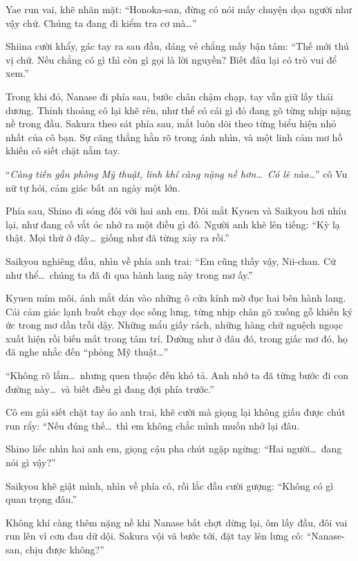 \documentclass[../main.tex]{subfiles}
\begin{document}
Yae run vai, khẽ nhăn mặt: ``Honoka-san, đừng có nói mấy chuyện dọa người như vậy chứ. Chúng ta đang đi kiểm tra cơ mà\dots''

Shiina cười khẩy, gác tay ra sau đầu, dáng vẻ chẳng mấy bận tâm: ``Thế mới thú vị chứ. Nếu chẳng có gì thì còn gì gọi là lời nguyền? Biết đâu lại có trò vui để xem.''

Trong khi đó, Nanase đi phía sau, bước chân chậm chạp, tay vẫn giữ lấy thái dương. Thỉnh thoảng cô lại khẽ rên, như thể có cái gì đó đang gõ từng nhịp nặng nề trong đầu. Sakura theo sát phía sau, mắt luôn dõi theo từng biểu hiện nhỏ nhất của cô bạn. Sự căng thẳng hằn rõ trong ánh nhìn, và một linh cảm mơ hồ khiến cô siết chặt nắm tay.

``\textit{Càng tiến gần phòng Mỹ thuật, linh khí càng nặng nề hơn\dots\ Có lẽ nào\dots}'' cô Vu nữ tự hỏi, cảm giác bất an ngày một lớn.

Phía sau, Shino đi sóng đôi với hai anh em. Đôi mắt Kyuen và Saikyou hơi nhíu lại, như đang cố vắt óc nhớ ra một điều gì đó. Người anh khẽ lên tiếng: ``Kỳ lạ thật. Mọi thứ ở đây\dots\ giống như đã từng xảy ra rồi.''

Saikyou nghiêng đầu, nhìn về phía anh trai: ``Em cũng thấy vậy, Nii-chan. Cứ như thể\dots\ chúng ta đã đi qua hành lang này trong mơ ấy.''

Kyuen mím môi, ánh mắt dán vào những ô cửa kính mờ đục hai bên hành lang. Cái cảm giác lạnh buốt chạy dọc sống lưng, từng nhịp chân gõ xuống gỗ khiến ký ức trong mơ dần trỗi dậy. Những mẩu giấy rách, những hàng chữ nguệch ngoạc xuất hiện rồi biến mất trong tâm trí. Dường như ở đâu đó, trong giấc mơ đó, họ đã nghe nhắc đến ``phòng Mỹ thuật\dots''

``Không rõ lắm\dots\ nhưng quen thuộc đến khó tả. Anh nhớ ta đã từng bước đi con đường này\dots\ và biết điều gì đang đợi phía trước.''

Cô em gái siết chặt tay áo anh trai, khẽ cười mà giọng lại không giấu được chút run rẩy: ``Nếu đúng thế\dots\ thì em không chắc mình muốn nhớ lại đâu.

Shino liếc nhìn hai anh em, giọng cậu pha chút ngập ngừng: ``Hai người\dots\ đang nói gì vậy?''

Saikyou khẽ giật mình, nhìn về phía cô, rồi lắc đầu cười gượng: ``Không có gì quan trọng đâu.''

Không khí càng thêm nặng nề khi Nanase bất chợt dừng lại, ôm lấy đầu, đôi vai run lên vì cơn đau dữ dội. Sakura vội vã bước tới, đặt tay lên lưng cô: ``Nanase-san, chịu được không?''
\end{document}
